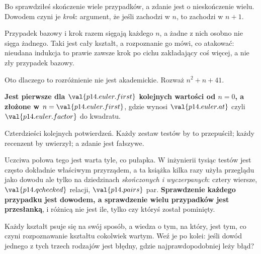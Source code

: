 \begin{fr}
\begin{ansblock}
Bo sprawdziłeś skończenie wiele przypadków, a zdanie jest o nieskończenie
wielu. Dowodem czyni je \emph{krok}: argument, że jeśli zachodzi w $n$, to
zachodzi w $n+1$.
\end{ansblock}

Przypadek bazowy i krok razem sięgają każdego $n$, a żadne z nich osobno nie
sięga żadnego. Taki jest cały kształt, a rozpoznanie go mówi, co atakować:
nieudana indukcja to prawie zawsze krok po cichu zakładający coś więcej, a nie
zły przypadek bazowy.

Oto dlaczego to rozróżnienie nie jest akademickie. Rozważ $n^{2} + n + 41$.


\begin{trapbox}
\textbf{Jest pierwsze dla $\val{p14.euler.first}$ kolejnych wartości od
$n = 0$, a złożone w $n = \val{p14.euler.first}$}, gdzie wynosi
$\val{p14.euler.at}$ \dash{} czyli $\val{p14.euler.factor}$ do kwadratu.

Czterdzieści kolejnych potwierdzeń. Każdy zestaw testów by to przepuścił;
każdy recenzent by uwierzył; a zdanie jest fałszywe.

Uczciwa połowa tego jest warta tyle, co pułapka. W inżynierii tysiąc testów
jest często dokładnie właściwym przyrządem, a ta książka kilka razy użyła
przeglądu jako dowodu \dash{} ale tylko na dziedzinach \emph{skończonych i
wyczerpanych}: cztery wiersze, $\val{p14.qchecked}$ relacji,
$\val{p14.pairs}$ par. \textbf{Sprawdzenie każdego przypadku jest dowodem, a
sprawdzenie wielu przypadków jest przesłanką}, i różnicą nie jest ile, tylko
czy któryś został pominięty.
\end{trapbox}
\end{fr}

\begin{fr}
Każdy kształt psuje się na swój sposób, a wiedza o tym, na który, jest tym, co
czyni rozpoznawanie kształtu cokolwiek wartym. Weź je po kolei: jeśli dowód
jednego z tych trzech rodzajów jest błędny, gdzie najprawdopodobniej leży
błąd?
\dotline
\nextframe
\end{fr}

